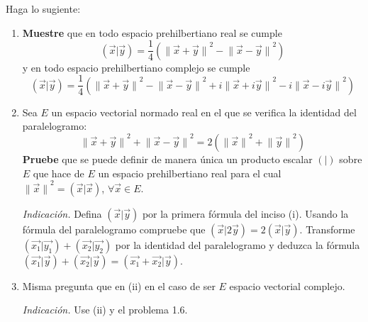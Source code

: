 \documentclass[12pt]{report}
\theoremstyle{largebreak}
\newcommand\pint[2]{\ensuremath{\left(#1\big|#2\right)}}
\newcommand\norm[1]{\ensuremath{\|#1\|}}
\begin{document}
    \begin{excer}
        Haga lo sugiente:
        \begin{enumerate}
            \item \textbf{Muestre} que en todo espacio prehilbertiano real se cumple
            \begin{equation*}
                \pint{\vec{x}}{\vec{y}}=\frac{1}{4}\left(\norm{\vec{x}+\vec{y}}^2-\norm{\vec{x}-\vec{y}}^2 \right)
            \end{equation*}
            y en todo espacio prehilbertiano complejo se cumple
            \begin{equation*}
                \pint{\vec{x}}{\vec{y}}=\frac{1}{4}\left(\norm{\vec{x}+\vec{y}}^2-\norm{\vec{x}-\vec{y}}^2+i\norm{\vec{x}+i\vec{y}}^2-i\norm{\vec{x}-i\vec{y}}^2 \right)
            \end{equation*}
            \item Sea $E$ un espacio vectorial normado real en el que se verifica la identidad del paralelogramo:
            \begin{equation*}
                \norm{\vec{x}+\vec{y}}^2+\norm{\vec{x}-\vec{y}}^2=2(\norm{\vec{x}}^2+\norm{\vec{y}}^2)
            \end{equation*}
            \textbf{Pruebe} que se puede definir de manera única un producto escalar $\pint{ }{ }$ sobre $E$ que hace de $E$ un espacio prehilbertiano real para el cual $\norm{\vec{x}}^2=\pint{\vec{x}}{\vec{x}}$, $\forall\vec{x}\in E$.

            \textit{Indicación.} Defina $\pint{\vec{x}}{\vec{y}}$ por la primera fórmula del inciso (i). Usando la fórmula del paralelogramo compruebe que $\pint{\vec{x}}{2\vec{y}}=2\pint{\vec{x}}{\vec{y}}$. Transforme $\pint{\vec{x_1}}{\vec{y_1}}+\pint{\vec{x_2}}{\vec{y_2}}$ por la identidad del paralelogramo y deduzca la fórmula $\pint{\vec{x_1}}{\vec{y}}+\pint{\vec{x_2}}{\vec{y}}=\pint{\vec{x_1}+\vec{x_2}}{\vec{y}}$.

            \item Misma pregunta que en (ii) en el caso de ser $E$ espacio vectorial complejo. 
            
            \textit{Indicación.} Use (ii) y el problema 1.6.
        \end{enumerate}
    \end{excer}

    \begin{sol}
        
    \end{sol}
\end{document}
